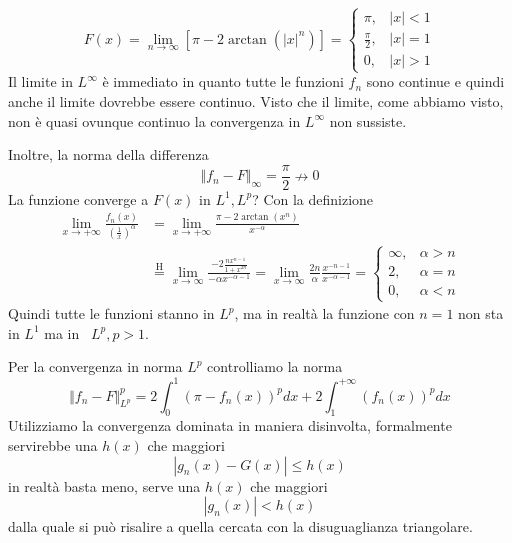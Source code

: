 \begin{equation*}
F(x) = \lim_{n\rightarrow \infty}\left[ \pi - 2\arctan (|x|^{n})\right] =
\begin{cases}
\pi, & |x| < 1\\
\frac{\pi}{2}, & |x| = 1\\
0, & |x| > 1
\end{cases}
\end{equation*}
Il limite in $L^{\infty}$ è immediato in quanto tutte le funzioni $f_{n}$ sono continue e quindi anche il limite dovrebbe essere continuo. Visto che il limite, come abbiamo visto, non è quasi ovunque continuo la convergenza in $L^{\infty}$ non sussiste.

Inoltre, la norma della differenza
\begin{equation*}
\Vert f_{n} - F\Vert_{\infty} = \frac{\pi}{2} \nrightarrow 0
\end{equation*}
La funzione converge a $F(x)$ in $L^{1}, L^{p}$? Con la definizione
\begin{equation*}
\begin{aligned}
\lim_{x\rightarrow + \infty}\frac{f_{n} (x)}{\left(\frac{1}{x}\right)^{\alpha}} & = \lim_{x\rightarrow + \infty}\frac{\pi - 2\arctan (x^{n})}{x^{- \alpha}}\\
 & \overset{\text{H}}{=}\lim_{x\rightarrow \infty}\frac{- 2\frac{nx^{n - 1}}{1 + x^{2n}}}{- \alpha x^{- \alpha - 1}} = \lim_{x\rightarrow \infty}\frac{2n}{\alpha}\frac{x^{- n - 1}}{x^{- \alpha - 1}} =
\begin{cases}
\infty, & \alpha > n\\
2, & \alpha = n\\
0, & \alpha < n
\end{cases}
\end{aligned}
\end{equation*}
Quindi tutte le funzioni stanno in $L^{p}$, ma in realtà la funzione con $n = 1$ non sta in $L^{1}$ ma in \ $L^{p}, p > 1$.

Per la convergenza in norma $L^{p}$ controlliamo la norma
\begin{equation*}
\Vert f_{n} - F\Vert^{p}_{L^{p}} = 2\int^{1}_{0} (\pi - f_{n} (x))^{p} dx + 2\int^{+ \infty}_{1} (f_{n} (x))^{p} dx
\end{equation*}
Utilizziamo la convergenza dominata in maniera disinvolta, formalmente servirebbe una $h(x)$ che maggiori
\begin{equation*}
| g_{n}(x) - G(x)| \leq h(x)
\end{equation*}
in realtà basta meno, serve una $h(x)$ che maggiori
\begin{equation*}
| g_{n}(x)| < h(x)
\end{equation*}
dalla quale si può risalire a quella cercata con la disuguaglianza triangolare.

